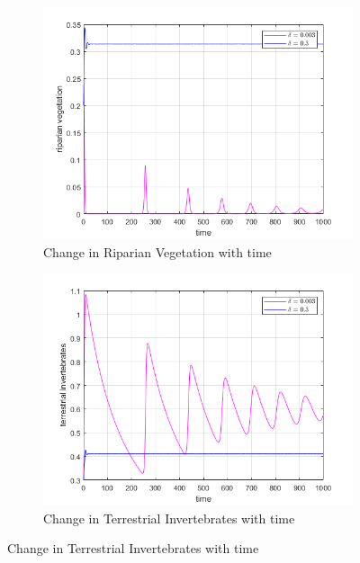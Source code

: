 \documentclass[12pt]{article}
\numberwithin{equation}{section}
\begin{document}
\FloatBarrier
\begin{figure}[bp!]
	\centering
	\begin{subfigure}[t]{0.45\textwidth}
		\centering
	\includegraphics[width=\textwidth]{time_vs_riparian_delta.png}
		\caption{Change in Riparian Vegetation with time} \label{fig:time_vs_riparian_delta}
	\end{subfigure}
\hspace{0.08\textwidth}
        \begin{subfigure}[t]{0.45\textwidth}
                 \centering
         \includegraphics[width=\textwidth]{time_vs_invertebrates_delta.png}
		\caption{Change in Terrestrial Invertebrates with time} \label{fig:time_vs_invertebrates_delta}

\end{subfigure}
\end{figure}
\end{document}
